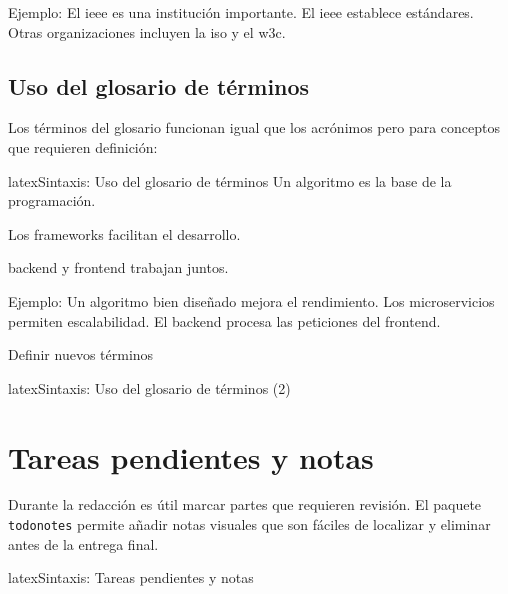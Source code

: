 Ejemplo: El \gls{ieee} es una institución importante. El \gls{ieee} establece estándares. Otras organizaciones incluyen la \gls{iso} y el \gls{w3c}.

\subsection{Uso del glosario de términos}
\label{subsec:uso-glosario}

Los términos del glosario funcionan igual que los acrónimos pero para
conceptos que requieren definición:

\begin{codigosimple}{latex}{Sintaxis: Uso del glosario de términos}
Un \gls{algoritmo} es la base de la programación.

Los \glspl{framework} facilitan el desarrollo.

\Gls{backend} y \gls{frontend} trabajan juntos.
\end{codigosimple}

Ejemplo: Un \gls{algoritmo} bien diseñado mejora el rendimiento. Los \glspl{microservicio} permiten \gls{escalabilidad}. El \gls{backend} procesa las peticiones del \gls{frontend}.

\begin{tipbox}{Definir nuevos términos}
  \begin{codigosimple}{latex}{Sintaxis: Uso del glosario de términos (2)}
  \end{codigosimple}
\end{tipbox}

\section{Tareas pendientes y notas}
\label{sec:todonotes}

Durante la redacción es útil marcar partes que requieren revisión.
El paquete \texttt{todonotes} permite añadir notas visuales que son fáciles
de localizar y eliminar antes de la entrega final.

\begin{codigosimple}{latex}{Sintaxis: Tareas pendientes y notas}


\end{codigosimple}

